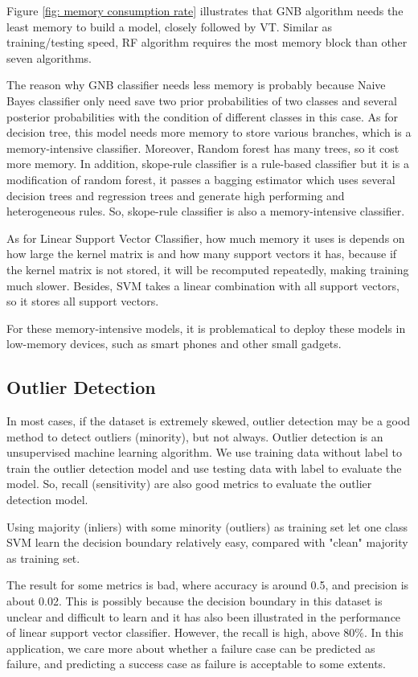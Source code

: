 Figure \ref{fig: memory consumption rate} illustrates that GNB algorithm needs the least memory to build a model, closely followed by VT. Similar as training/testing speed, RF algorithm  requires the most memory block than other seven algorithms.

The reason why GNB classifier needs less memory is probably because Naive Bayes classifier only need save two prior probabilities of two classes and several posterior probabilities with the condition of different classes in this case. As for decision tree, this model needs more memory to store various branches, which is a memory-intensive classifier. Moreover, Random forest has many trees, so it cost more memory. In addition, skope-rule classifier is a rule-based classifier but it is a modification of random forest, it passes a bagging estimator which uses several decision trees and regression trees and generate high performing and heterogeneous rules. So, skope-rule classifier is also a memory-intensive classifier. 

As for Linear Support Vector Classifier, how much memory it uses is depends on how large the kernel matrix is and how many support vectors it has, because if the kernel matrix is not stored, it will be recomputed repeatedly, making training much slower. Besides, SVM takes a linear combination with all support vectors, so it stores all support vectors.

For these memory-intensive models, it is  problematical to deploy these models in low-memory devices, such as smart phones and other small gadgets. 
\subsection{Outlier Detection}
In most cases, if the dataset is extremely skewed, outlier detection may be a good method to detect outliers (minority), but not always. Outlier detection is an unsupervised machine learning algorithm. We use training data without label to train the outlier detection model and use testing data with label to evaluate the model. So, recall (sensitivity) are also good metrics to evaluate the outlier detection model.

Using majority (inliers) with some minority (outliers) as training set let one class SVM learn the decision boundary relatively easy, compared with "clean" majority as training set. 

The result for some metrics is bad, where accuracy is around 0.5, and precision is about 0.02. This is possibly because the decision boundary in this dataset is unclear and difficult to learn and it has also been illustrated in the performance of linear support vector classifier. However, the recall is high, above 80$\%$. In this application, we care more about whether a failure case can be predicted as failure, and predicting a success case as failure is acceptable to some extents.

